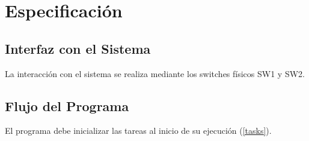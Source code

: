 \documentclass[a4paper,openright,12pt]{article}
\begin{document}
\section{Especificación}
\subsection{Interfaz con el Sistema}\label{design_button_translation}
La interacción con el sistema se realiza mediante los switches físicos SW1 y SW2. %

\subsection{Flujo del Programa}\label{pseudo_program_flow}
El programa debe inicializar las tareas al inicio de su ejecución (\ref{tasks}).
\end{document}
